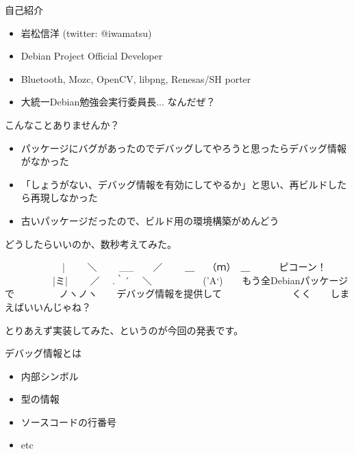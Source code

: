 \begin{frame}{自己紹介}
  \begin{itemize}
  \item 岩松信洋 (twitter: @iwamatsu)
  \item Debian Project Official Developer
  \item Bluetooth, Mozc, OpenCV, libpng, Renesas/SH porter
  \item 大統一Debian勉強会実行委員長... なんだぜ？
  \end{itemize}
\end{frame}

\begin{frame}{こんなことありませんか？}
\begin{itemize}[<+->]
\item パッケージにバグがあったのでデバッグしてやろうと思ったらデバッグ情報がなかった
\item 「しょうがない、デバッグ情報を有効にしてやるか」と思い、再ビルドしたら再現しなかった
\item 古いパッケージだったので、ビルド用の環境構築がめんどう
\end{itemize}
\end{frame}

\begin{frame}
\begin{center}
\Huge{どうしたらいいのか、数秒考えてみた。}
\end{center}
\end{frame}

\begin{frame}[containsverbatim]

\begin{mycommandline}
　　　　　　|
　　＼　　 __　　／
　　＿　 （ｍ）　＿　　　ピコーン！
　　　　　|ミ|
　　／ 　.｀´　 ＼
　　　　　('A`)　　もう全Debianパッケージで
　　　　 ノヽノヽ　　デバッグ情報を提供して
　　　　　　　くく　　しまえばいいんじゃね？

\end{mycommandline}
\end{frame}


\begin{frame}[containsverbatim]

\begin{center}
\Huge{とりあえず実装してみた、というのが今回の発表です。}
\end{center}
\end{frame}

\begin{frame}{デバッグ情報とは}
\begin{itemize}
\item 内部シンボル
\item 型の情報
\item ソースコードの行番号
\item etc
\end{itemize}
\end{frame}

